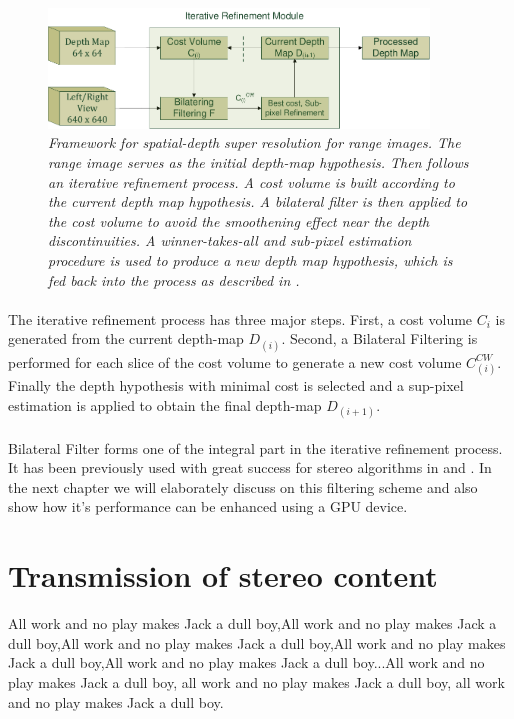 \begin{figure}[ht]
\centerline{\includegraphics[width=0.9\textwidth]{Spatial_Depth_Super_Resolution_for_Range_Images.pdf}}
\caption[Framework for spatial-depth super resolution for range images]%
{\textit{Framework for spatial-depth super resolution for range images. The range image serves as the initial depth-map hypothesis. Then follows an iterative refinement process. A cost volume is built according to the current depth map hypothesis. A bilateral filter is then applied to the cost volume to avoid the smoothening effect near the depth discontinuities. A winner-takes-all and sub-pixel estimation procedure is used to produce a new depth map hypothesis, which is fed back into the process as described in \cite{Spatial_Depth_Super_Resolution}.}\label{fig:chapter2_op}}
\end{figure}

\paragraph{}
The iterative refinement process has three major steps. First, a cost volume $C_{i}$ is generated from the current depth-map $D_{(i)}$. Second, a Bilateral Filtering is performed for each slice of the cost volume to generate a new cost volume $C_{(i)}^{CW}$. Finally the depth hypothesis with minimal cost is selected and a sup-pixel estimation is applied to obtain the final depth-map $D_{(i+1)}$.

\paragraph{}
Bilateral Filter forms one of the integral part in the iterative refinement process. It has been previously used with great success for stereo algorithms in \cite{Stereo_Matching} and \cite{Adaptive_Support_Weight_Approach}. In the next chapter we will elaborately discuss on this filtering scheme and also show how it's performance can be enhanced using a GPU device.

\section{Transmission of stereo content}
All work and no play makes Jack a dull boy,All work and no play makes Jack a dull boy,All work and no play makes Jack a dull boy,All work and no play makes Jack a dull boy,All work and no play makes Jack a dull boy...All work and no play makes Jack a dull boy, all work and no play makes Jack a dull boy, all work and no play makes Jack a dull boy.
